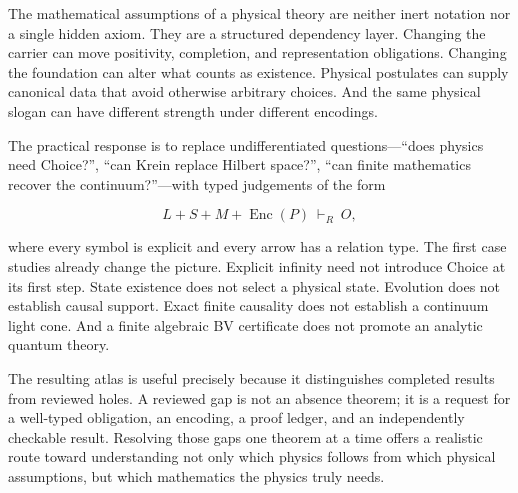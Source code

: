 \documentclass[11pt]{article}
\theoremstyle{definition}
\theoremstyle{remark}
\newcommand{\Enc}{\operatorname{Enc}}
\begin{document}
The mathematical assumptions of a physical theory are neither inert notation
nor a single hidden axiom.  They are a structured dependency layer.  Changing
the carrier can move positivity, completion, and representation obligations.
Changing the foundation can alter what counts as existence.  Physical
postulates can supply canonical data that avoid otherwise arbitrary choices.
And the same physical slogan can have different strength under different
encodings.

The practical response is to replace undifferentiated questions---``does
physics need Choice?'', ``can Krein replace Hilbert space?'', ``can finite
mathematics recover the continuum?''---with typed judgements of the form

\[
       L+S+M+\Enc(P)\ \vdash_R\ O,
\]

where every symbol is explicit and every arrow has a relation type.  The first
case studies already change the picture.  Explicit infinity need not introduce
Choice at its first step.  State existence does not select a physical state.
Evolution does not establish causal support.  Exact finite causality does not
establish a continuum light cone.  And a finite algebraic BV certificate does
not promote an analytic quantum theory.

The resulting atlas is useful precisely because it distinguishes completed
results from reviewed holes.  A reviewed gap is not an absence theorem; it is
a request for a well-typed obligation, an encoding, a proof ledger, and an
independently checkable result.  Resolving those gaps one theorem at a time offers a realistic route toward understanding
not only which physics follows from which physical assumptions, but which
mathematics the physics truly needs.

\appendix
{}
  {}
  {}
\end{document}
